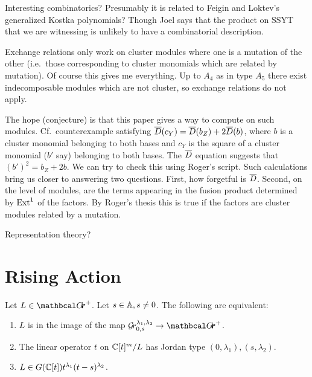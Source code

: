 \documentclass[draft]{article}
\begin{document}
Interesting combinatorics? Presumably it is related to Feigin and Loktev's generalized Kostka polynomials? Though Joel says that the product on SSYT that we are witnessing is unlikely to have a combinatorial description. 

Exchange relations only work on cluster modules where one is a mutation of the other (i.e.\ those corresponding to cluster monomials which are related by mutation). Of course this gives me everything. Up to $A_4$ as in type $A_5$ there exist indecomposable modules which are not cluster, so exchange relations do not apply. 

The hope (conjecture) is that this paper gives a way to compute on such modules. Cf.\ counterexample satisfying $\barD(c_Y) = \barD(b_Z) + 2\barD(b)$, where $b$ is a cluster monomial belonging to both bases and $c_Y$ is the square of a cluster monomial ($b'$ say) belonging to both bases. The $\barD$ equation suggests that $(b')^2 = b_Z + 2b$. We can try to check this using Roger's script. Such calculations bring us closer to answering two questions. First, how forgetful is $\barD$. Second, on the level of modules, are the terms appearing in the fusion product determined by $\Ext^1$ of the factors. By Roger's thesis this is true if the factors are cluster modules related by a mutation. 


Representation theory? 

\section{Rising Action} %

\begin{lemma} \label{le:Grl1l2}
    Let $ L \in \Grth^+ $.  Let $ s \in \AA, s \ne 0 $.  The following are equivalent:
    \begin{enumerate}
        \item $ L $ is in the image of the map $ \Gr^{\lambda_1, \lambda_2}_{0,s} \rightarrow \Grth^+$. 
        \item The linear operator $ t $ on $ \CC[t]^m/L$ has Jordan type $(0,\lambda_1), (s,\lambda_2)$.
        \item $ L \in G(\CC[t]) t^{\lambda_1} (t-s)^{\lambda_2}$.
    \end{enumerate}
\end{lemma}
\end{document}
